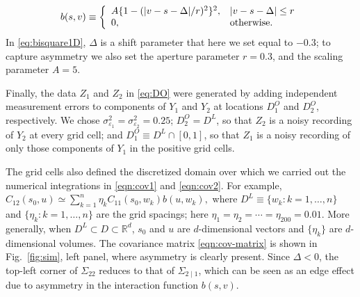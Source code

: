\documentclass[lineno]{biometrika}
\def\T{{ \mathrm{\scriptscriptstyle T} }}
\newcommand{\Bmat} {B}
\newcommand{\svec} {s}
\newcommand{\uvec} {u}
\newcommand{\Yvec}{Y}
\newcommand{\Zvec}{Z}
\newcommand{\bSigma}{\Sigma}
\newcommand{\diag}{\mathrm{diag}}
\let\originalleft\left
\let\originalright\right
\renewcommand{\left}{\mathopen{}\mathclose\bgroup\originalleft}
\renewcommand{\right}{\aftergroup\egroup\originalright}
\begin{document}
\begin{equation}\label{eq:bisquare1D}
b(s,v) \equiv \left\{\begin{array}{ll} A\{1 - (|v- s - \Delta|/r)^2\}^2, &| v -s  - \Delta| \le r \\ 0, & \textrm{otherwise}. \end{array} \right. 
\end{equation}
\noindent In \eqref{eq:bisquare1D}, $\Delta$ is a shift parameter that here we set equal to $-0.3$; to capture asymmetry we also set the aperture parameter $r = 0.3$, and the scaling parameter $A = 5$. 

Finally, the data $\Zvec_1$ and $\Zvec_2$ in \eqref{eq:DO} were generated by adding independent measurement errors to components of $\Yvec_1$ and $\Yvec_2$ at locations $D_1^O$ and $D_2^O$, respectively. We chose $\sigma^2_{\varepsilon_1} = \sigma^2_{\varepsilon_2} = 0.25$; $D_2^O = D^L$, so that $\Zvec_2$ is a noisy recording of $\Yvec_2$ at every grid cell; and $D_1^O \equiv D^L \cap [0,1]$, so that $\Zvec_1$ is a noisy recording of only those components of $\Yvec_1$ in the positive grid cells.

The grid cells also defined the discretized domain over which we carried out the numerical integrations in \eqref{eqn:cov1} and \eqref{eqn:cov2}. For example, $C_{12}(s_0,u) \simeq \sum_{k=1}^{n} \eta_k C_{11}(s_0,w_k)b(u,w_k),$ where $D^L \equiv \{w_k : k=1,\dots,n\}$ and $\{\eta_k: k = 1,\dots,n\}$ are the grid spacings; here $\eta_1 = \eta_2 = \cdots = \eta_{200} = 0.01$. More generally, when $D^L \subset D \subset \mathbb{R}^d$, $\svec_0$ and $\uvec$ are $d$-dimensional vectors and $\{\eta_k\}$ are $d$-dimensional volumes. The covariance matrix \eqref{eqn:cov-matrix} is shown in Fig.~\ref{fig:sim}, left panel, where asymmetry is clearly present. Since $\Delta < 0$, the top-left corner of $\bSigma_{22}$ reduces to that of $\bSigma_{2\mid 1}$, which can be seen as an edge effect due to asymmetry in the interaction function $b(s,v)$.

\end{document}
